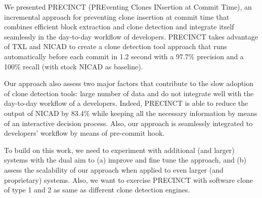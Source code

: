 \documentclass[conference]{IEEEtran}
\begin{document}
We presented PRECINCT (PREventing Clones INsertion at Commit Time), an incremental approach for preventing clone insertion at commit time that combines efficient block extraction and clone detection and integrate itself seamlessly in the day-to-day workflow of developers.
PRECINCT takes advantage of TXL and NICAD to create a clone detection tool approach that runs automatically before each commit in 1.2 second with a 97.7\% precision and a 100\% recall (with stock NICAD as baseline).

Our approach also assess two major factors that contribute to the slow adoption of clone detection tools: large number of data and do not integrate well with the day-to-day workflow of a developers.
Indeed, PRECINCT is able to reduce the output of NICAD by 83.4\% while keeping all the necessary information by means of an interactive decision process.
Also, our approach is seamlessly integrated to developers' workflow by means of pre-commit hook.

To build on this work, we need to experiment with additional (and larger) systems with the dual aim to (a) improve and fine tune the approach, and (b) assess the scalability of our approach when applied to even larger (and proprietary) systems. Also, we want to exercise PRECINCT with software clone of type 1 and 2 as same as different clone detection engines.




\end{document}
